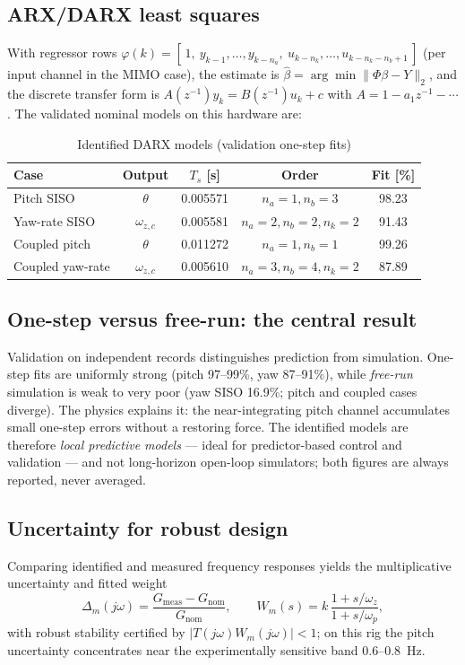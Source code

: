 \documentclass[conference]{IEEEtran}
\begin{document}
\subsection{ARX/DARX least squares}
With regressor rows
$\varphi(k) = [\,1,\ y_{k-1},\dots,y_{k-n_a},\ u_{k-n_k},\dots,u_{k-n_k-n_b+1}\,]$
(per input channel in the MIMO case), the estimate is $\hat\beta = \arg\min\|\Phi\beta - Y\|_2$, and the discrete transfer form is $A(z^{-1})y_k = B(z^{-1})u_k + c$ with $A = 1 - a_1z^{-1} - \cdots$. The validated nominal models on this hardware are:
\begin{table}[h]
\caption{Identified DARX models (validation one-step fits)}
\centering
\begin{tabular}{lcccc}
\toprule
Case & Output & $T_s$ [s] & Order & Fit [\%]\\
\midrule
Pitch SISO & $\theta$ & 0.005571 & $n_a{=}1,n_b{=}3$ & 98.23\\
Yaw-rate SISO & $\omega_{z,c}$ & 0.005581 & $n_a{=}2,n_b{=}2,n_k{=}2$ & 91.43\\
Coupled pitch & $\theta$ & 0.011272 & $n_a{=}1,n_b{=}1$ & 99.26\\
Coupled yaw-rate & $\omega_{z,c}$ & 0.005610 & $n_a{=}3,n_b{=}4,n_k{=}2$ & 87.89\\
\bottomrule
\end{tabular}
\end{table}

\subsection{One-step versus free-run: the central result}
Validation on independent records distinguishes prediction from simulation. One-step fits are uniformly strong (pitch 97--99\%, yaw 87--91\%), while \emph{free-run} simulation is weak to very poor (yaw SISO 16.9\%; pitch and coupled cases diverge). The physics explains it: the near-integrating pitch channel accumulates small one-step errors without a restoring force. The identified models are therefore \emph{local predictive models} --- ideal for predictor-based control and validation --- and not long-horizon open-loop simulators; both figures are always reported, never averaged.

\subsection{Uncertainty for robust design}
Comparing identified and measured frequency responses yields the multiplicative uncertainty and fitted weight
\begin{equation}
\Delta_m(j\omega) = \frac{G_{\mathrm{meas}} - G_{\mathrm{nom}}}{G_{\mathrm{nom}}},\qquad
W_m(s) = k\,\frac{1 + s/\omega_z}{1 + s/\omega_p},
\end{equation}
with robust stability certified by $|T(j\omega)W_m(j\omega)| < 1$; on this rig the pitch uncertainty concentrates near the experimentally sensitive band $0.6$--$0.8$~Hz.
\end{document}
